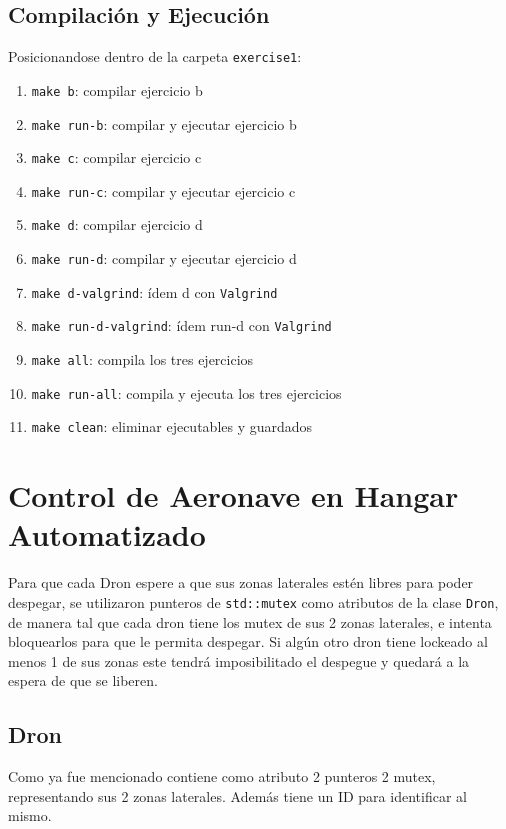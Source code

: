 \documentclass[11pt, a4paper]{article}
\begin{document}
\begin{multicols}{2}
\subsection{Compilación y Ejecución}

Posicionandose dentro de la carpeta \lstinline|exercise1|:
\begin{enumerate}[label=\roman*.]
    \item \lstinline|make b|: compilar ejercicio b
    \item \lstinline|make run-b|: compilar y ejecutar ejercicio b
    \item \lstinline|make c|: compilar ejercicio c
    \item \lstinline|make run-c|: compilar y ejecutar ejercicio c
    \item \lstinline|make d|: compilar ejercicio d
    \item \lstinline|make run-d|: compilar y ejecutar ejercicio d
    \item \lstinline|make d-valgrind|: ídem d con \lstinline|Valgrind|
    \item \lstinline|make run-d-valgrind|: ídem run-d con \lstinline|Valgrind|
    \item \lstinline|make all|: compila los tres ejercicios
    \item \lstinline|make run-all|: compila y ejecuta los tres ejercicios
    \item \lstinline|make clean|: eliminar ejecutables y guardados
\end{enumerate}

\section{Control de Aeronave en Hangar Automatizado}

Para que cada Dron espere a que sus zonas laterales estén libres para poder despegar, se utilizaron punteros de \lstinline|std::mutex| como atributos de la clase \lstinline|Dron|, de manera tal que cada dron tiene los mutex de sus 2 zonas laterales, e intenta bloquearlos para que le permita despegar. Si algún otro dron tiene lockeado al menos 1 de sus zonas este tendrá imposibilitado el despegue y quedará a la espera de que se liberen.

\subsection{Dron}

Como ya fue mencionado contiene como atributo 2 punteros 2 mutex, representando sus 2 zonas laterales. Además tiene un ID para identificar al mismo.


\end{multicols}
\end{document}
